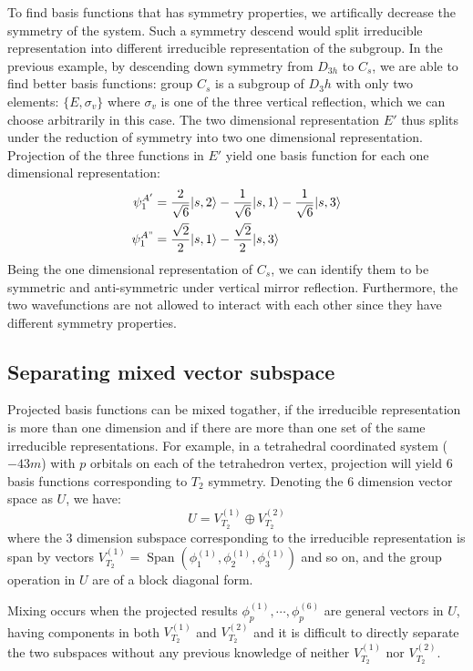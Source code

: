\documentclass{article}
\DeclareMathOperator{\spn}{Span}
\begin{document}
To find basis functions that has symmetry properties, we artifically decrease the symmetry of the system. 
Such a symmetry descend would split irreducible representation into different irreducible representation 
of the subgroup. 
In the previous example, by descending down symmetry from $D_{3h}$ to $C_s$, 
we are able to find better basis functions: group $C_s$ is a subgroup 
of $D_3h$ with only two elements: $\{E, \sigma_v\}$ where $\sigma_v$ is one of the three vertical reflection, 
which we can choose arbitrarily in this case. 
The two dimensional representation $E'$ thus splits under the reduction of symmetry into two one dimensional representation.
Projection of the three functions in $E'$ yield one basis function for each one dimensional representation:
\begin{align}
    \psi_1^{A'} &= \frac{2}{\sqrt{6}} |s,2\rangle - \frac{1}{\sqrt{6}} |s,1\rangle - \frac{1}{\sqrt{6}} |s,3\rangle \\
    \psi_1^{A"} &= \frac{\sqrt{2}}{2} |s,1\rangle - \frac{\sqrt{2}}{2} |s,3\rangle
\end{align}
Being the one dimensional representation of $C_s$, we can identify them to be 
symmetric and anti-symmetric under vertical mirror reflection. Furthermore, the two wavefunctions 
are not allowed to interact with each other since they have different symmetry properties.

\subsection{Separating mixed vector subspace}
Projected basis functions can be mixed togather, if the irreducible representation 
is more than one dimension and if there are more than one set of the same irreducible 
representations. For example, in a tetrahedral coordinated system ($-43m$) with $p$ orbitals on 
each of the tetrahedron vertex, projection will yield 6 basis functions corresponding to 
$T_2$ symmetry. 
Denoting the 6 dimension vector space as $U$, we have:
\begin{equation}
    U = V_{T_2}^{(1)} \oplus V_{T_2}^{(2)}
\end{equation}
where the 3 dimension subspace corresponding to the irreducible representation is span by 
vectors $V_{T_2}^{(1)} = \spn(\phi_1^{(1)},\phi_2^{(1)},\phi_3^{(1)})$ and so on, and the 
group operation in $U$ are of a block diagonal form.

Mixing occurs when the projected results $\phi_p^{(1)},\cdots,\phi_p^{(6)}$ are general 
vectors in $U$, having components in both $V_{T_2}^{(1)}$ and $V_{T_2}^{(2)}$ and it is 
difficult to directly separate the two subspaces without any previous knowledge of neither
$V_{T_2}^{(1)}$ nor $V_{T_2}^{(2)}$. 
\end{document}
